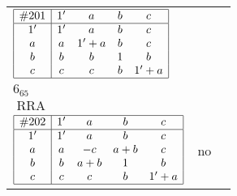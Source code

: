 \documentclass[12pt]{article}
\newcommand\RRA{\operatorname{RRA}}
\newcommand{\join}{\mathbin{+}}%
\newcommand{\id}{{1'}}%
\renewcommand{\top}{1}%
\begin{document}
\begin{center}
\begin{longtable}{l|c|c}
$
\begin{array}{|c|cccc|} \hline
\#201 & \id & a & b & c \\ \hline
\id & \id & a & b & c \\
a & a & \id \join a & b & c \\
b & b & b & \top & b \\
c & c & c & b & \id \join a \\ \hline
\end{array}
$
 & \begin{tabular}{c} yes \\ $6_{65}$ \\ $\RRA$ \end{tabular} 
 & \adjustbox{valign=c, max height=1.6cm}{$
\left[ \begin{array}{cccccc}
\id & a & a & b & c & b \\ 
a & \id & a & b & c & b \\ 
a & a & \id & b & c & b \\ 
b & b & b & \id & b & b \\ 
c & c & c & b & \id & b \\ 
b & b & b & b & b & \id
\end{array}\right]
$}      \\[15mm]

$
\begin{array}{|c|cccc|} \hline
\#202 & \id & a & b & c \\ \hline
\id & \id & a & b & c \\
a & a & -c & a \join b & c \\
b & b & a \join b & \top & b \\
c & c & c & b & \id \join a \\ \hline
\end{array}
$
 & no  
 & \adjustbox{valign=c, max height=1.6cm}{$
\left[ \begin{array}{ccccccc}
\id & a & a & b & b & b & b \\ 
a & \id & a & a & b & b & b \\ 
a & a & \id & b & b & b & b \\ 
b & a & b & \id & b & b & b \\ 
b & b & b & b & \id & c & a \\ 
b & b & b & b & c & \id & c \\ 
b & b & b & b & a & c & \id
\end{array}\right]
$}      \\[15mm]


\end{longtable}
\end{center}
\end{document}
